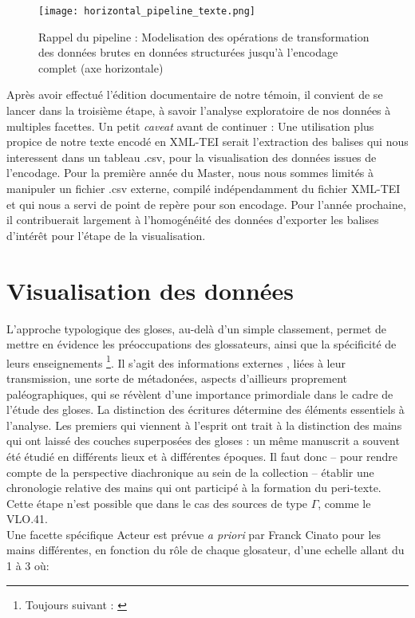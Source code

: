\documentclass[a4paper, twoside, 12pt]{book}
\begin{document}
\begin{figure}[H]
    \centering
    \texttt{[image: horizontal\_pipeline\_texte.png]}
    \caption{ Rappel du pipeline  : Modelisation des opérations de transformation des données brutes en données structurées jusqu'à l'encodage complet (axe horizontale)}
\end{figure}


Après avoir effectué l'édition documentaire de notre témoin, il convient de se lancer dans la troisième étape, à savoir l'analyse exploratoire de nos données à multiples facettes. Un petit \textit{caveat} avant de continuer : Une utilisation plus propice de notre texte encodé en XML-TEI serait l'extraction des balises qui nous interessent dans un tableau .csv, pour la visualisation des données issues de l'encodage. Pour la première année du Master, nous nous sommes limités à manipuler un fichier .csv externe, compilé indépendamment du fichier XML-TEI et qui nous a servi de point de repère pour son encodage. Pour l'année prochaine, il contribuerait largement à l'homogénéité des données d'exporter les balises d'intérêt pour l'étape de la visualisation.


\section{Visualisation des données}


L’approche typologique des gloses, au-delà d’un simple classement, permet de mettre en évidence les préoccupations des glossateurs, ainsi que la spécificité de leurs enseignements \footnote{Toujours suivant : \cite{cinato2011perspectives}}. Il s’agit des informations \og{} externes \fg{}, liées à leur transmission, une sorte de métadonées, aspects d'aillieurs proprement paléographiques, qui se révèlent d’une importance primordiale dans le cadre de l’étude des gloses. La distinction des écritures détermine des éléments essentiels à l’analyse. Les premiers qui viennent à l’esprit ont trait à la distinction des mains qui ont laissé des couches superposées des gloses : un même manuscrit a souvent été étudié en différents lieux et à différentes époques. Il faut donc – pour rendre compte de la perspective diachronique au sein de la collection – établir une chronologie relative des mains qui ont participé à la formation du peri-texte. Cette étape n’est possible que dans le cas des sources de type $\Gamma$, comme le VLO.41. \\

Une facette spécifique \og{} Acteur \fg{} est prévue \textit{a priori} par Franck Cinato pour les mains différentes, en fonction du rôle de chaque glosateur, d'une echelle allant du 1 à 3 où:
\end{document}
